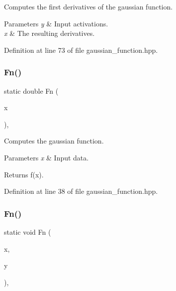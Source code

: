 Computes the first derivatives of the gaussian function. 


\begin{DoxyParams}{Parameters}
{\em y} & Input activations. \\
\hline
{\em x} & The resulting derivatives. \\
\hline
\end{DoxyParams}


Definition at line 73 of file gaussian\+\_\+function.\+hpp.

\mbox{\label{classmlpack_1_1ann_1_1GaussianFunction_a7be90336227c4673a4152dbac3d62c25}} 
\subsubsection{Fn()\hspace{0.1cm}{\footnotesize\ttfamily [1/2]}}
{\footnotesize\ttfamily static double Fn (\begin{DoxyParamCaption}\item[{const eT}]{x }\end{DoxyParamCaption})\hspace{0.3cm}{\ttfamily [inline]}, {\ttfamily [static]}}



Computes the gaussian function. 


\begin{DoxyParams}{Parameters}
{\em x} & Input data. \\
\hline
\end{DoxyParams}
\begin{DoxyReturn}{Returns}
f(x). 
\end{DoxyReturn}


Definition at line 38 of file gaussian\+\_\+function.\+hpp.

\mbox{\label{classmlpack_1_1ann_1_1GaussianFunction_af6cf5da90eb6312e3e25c9b8bd9c3527}} 
\subsubsection{Fn()\hspace{0.1cm}{\footnotesize\ttfamily [2/2]}}
{\footnotesize\ttfamily static void Fn (\begin{DoxyParamCaption}\item[{const Input\+Vec\+Type \&}]{x,  }\item[{Output\+Vec\+Type \&}]{y }\end{DoxyParamCaption})\hspace{0.3cm}{\ttfamily [inline]}, {\ttfamily [static]}}




